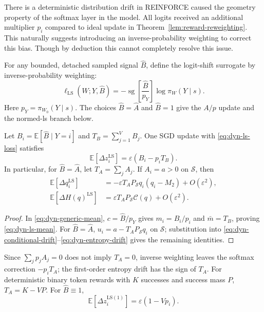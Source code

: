 \begin{insight}
  There is a deterministic distribution drift in REINFORCE caused the geometry property of the softmax layer in the model. All logits received an additional multiplier $p_i$ compared to ideal update in Theorem~\ref{lem:reward-reweighting}. This naturally suggests introducing an inverse-probability weighting to correct this bias. Though by deduction this cannot completely resolve this issue.
\end{insight}

For any bounded, detached sampled signal $\widehat B$, define the logit-shift
surrogate by inverse-probability weighting:
\begin{equation}
 \ell_{\mathrm{LS}}(W;Y,\widehat B)
 =-\operatorname{sg}\left[\frac{\widehat B}{p_Y}\right]
                  \log\pi_W(Y\mid s).
 \label{eq:dyn-ls-loss}
\end{equation}
Here $p_Y=\pi_{W_0}(Y\mid s)$. The choices $\widehat B=\widehat A$ and
$\widehat B=1$ give the $A/p$ update and the normed-ls branch below.

\begin{lemma}
\label{lem:dyn-logit-shift}
Let $B_i=\mathbb E[\widehat B\mid Y=i]$ and
$T_B=\sum_{j=1}^V B_j$. One SGD update with
\eqref{eq:dyn-ls-loss} satisfies
\begin{equation}
 \mathbb E[\Delta z_i^{\mathrm{LS}}]
 =\varepsilon(B_i-p_iT_B).
 \label{eq:dyn-ls-mean}
\end{equation}
In particular, for $\widehat B=\widehat A$, let
$T_A=\sum_jA_j$. If $A_i=a>0$ on $\mathcal S$, then
\begin{align}
 \mathbb E[\Delta q_i^{\mathrm{LS}}]
 &=-\varepsilon T_AP_{\mathcal S}q_i(q_i-M_2)+O(\varepsilon^2),
 \label{eq:dyn-ls-q}\\
 \mathbb E[\Delta H(q)^{\mathrm{LS}}]
 &=\varepsilon T_AP_{\mathcal S}\mathcal C(q)+O(\varepsilon^2).
 \label{eq:dyn-ls-h}
\end{align}
\end{lemma}

\begin{proof}
In \eqref{eq:dyn-generic-mean}, $c=\widehat B/p_Y$ gives $m_i=B_i/p_i$
and $\bar m=T_B$, proving \eqref{eq:dyn-ls-mean}. For
$\widehat B=\widehat A$, $u_i=a-T_AP_{\mathcal S}q_i$ on $\mathcal S$;
substitution into \eqref{eq:dyn-conditional-drift}--\ref{eq:dyn-entropy-drift}
gives the remaining identities.
\end{proof}

Since $\sum_jp_jA_j=0$ does not imply $T_A=0$, inverse weighting leaves
the softmax correction $-p_iT_A$; the first-order entropy drift has the
sign of $T_A$. For deterministic binary token rewards with $K$ successes
and success mass $P$, $T_A=K-VP$. For $\widehat B\equiv1$,
\begin{equation}
 \mathbb E[\Delta z_i^{\mathrm{LS}(1)}]
 =\varepsilon(1-Vp_i).
 \label{eq:dyn-ls-constant}
\end{equation}

